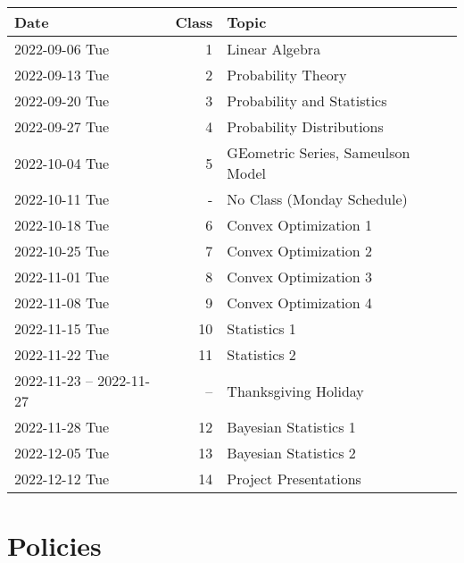 \documentclass[12pt,pdftex,twoside,letterpaper]{exam}
\begin{document}
\begin{center}
\begin{tabular}{lrl}
Date & Class & Topic\\
\hline
2022-09-06 Tue & 1 & Linear Algebra\\
2022-09-13 Tue & 2 & Probability Theory\\
2022-09-20 Tue & 3 & Probability and Statistics \\
2022-09-27 Tue & 4 & Probability Distributions \\
2022-10-04 Tue & 5 & GEometric Series, Sameulson Model\\
2022-10-11 Tue & - & No Class (Monday Schedule)\\
2022-10-18 Tue & 6 & Convex Optimization 1 \\
2022-10-25 Tue & 7 & Convex Optimization 2\\
2022-11-01 Tue & 8 & Convex Optimization 3\\
2022-11-08 Tue & 9 & Convex Optimization 4\\
2022-11-15 Tue & 10 & Statistics 1\\
2022-11-22 Tue & 11 & Statistics 2\\
2022-11-23 -- 2022-11-27  & -- & Thanksgiving Holiday\\
2022-11-28 Tue & 12 & Bayesian Statistics 1\\
2022-12-05 Tue & 13 & Bayesian Statistics 2\\
2022-12-12 Tue & 14 & Project Presentations\\
\end{tabular}
\end{center}


\newpage
\section*{Policies}
\end{document}
